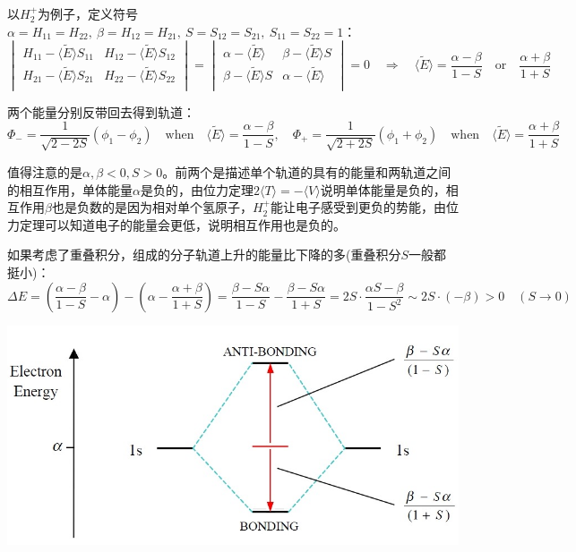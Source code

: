 以$H_2^+$为例子，定义符号$\alpha=H_{11}=H_{22}, \ \beta=H_{12}=H_{21}, \ S=S_{12}=S_{21}, \ S_{11}=S_{22}=1$：
\[\begin{vmatrix}
H_{11}-\langle\tilde{E}\rangle S_{11} & H_{12}-\langle\tilde{E}\rangle S_{12} \\
H_{21}-\langle\tilde{E}\rangle S_{21} & H_{22}-\langle\tilde{E}\rangle S_{22} \\
\end{vmatrix}=
\begin{vmatrix}
\alpha-\langle\tilde{E}\rangle & \beta-\langle\tilde{E}\rangle S \\
\beta-\langle\tilde{E}\rangle S & \alpha-\langle\tilde{E}\rangle \\
\end{vmatrix}=0 \quad \Rightarrow \quad \langle\tilde{E}\rangle=\frac{\alpha-\beta}{1-S} \quad \text{or} \quad \frac{\alpha+\beta}{1+S}\]

两个能量分别反带回去得到轨道：
\[\Phi_-=\frac{1}{\sqrt{2-2S}}(\phi_1-\phi_2) \quad \text{when} \quad \langle\tilde{E}\rangle=\frac{\alpha-\beta}{1-S}, \quad \Phi_+=\frac{1}{\sqrt{2+2S}}(\phi_1+\phi_2) \quad \text{when} \quad \langle\tilde{E}\rangle=\frac{\alpha+\beta}{1+S}\]

值得注意的是$\alpha,\beta<0,S>0$。前两个是描述单个轨道的具有的能量和两轨道之间的相互作用，单体能量$\alpha$是负的，由位力定理$2\langle T \rangle=-\langle V \rangle$说明单体能量是负的，相互作用$\beta$也是负数的是因为相对单个氢原子，$H_2^+$能让电子感受到更负的势能，由位力定理可以知道电子的能量会更低，说明相互作用也是负的。

如果考虑了重叠积分，组成的分子轨道上升的能量比下降的多(重叠积分$S$一般都挺小)：
\[\Delta E=\left(\frac{\alpha-\beta}{1-S}-\alpha\right)-\left(\alpha-\frac{\alpha+\beta}{1+S}\right)=\frac{\beta-S\alpha}{1-S}-\frac{\beta-S\alpha}{1+S}=2S \cdot \frac{\alpha S-\beta}{1-S^2}\sim 2S \cdot (-\beta)>0 \quad (S \to 0)\]

\begin{center}
    \includegraphics[scale=0.3]{fig/lzhx/Picture1.jpg}
\end{center}

